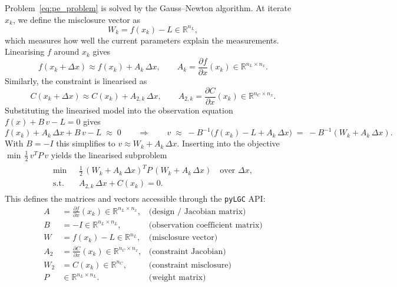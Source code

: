 \documentclass[a4paper,11pt]{article}
\newcommand{\code}[1]{\texttt{#1}}
\begin{document}
Problem~\eqref{eq:pe_problem} is solved by the Gauss--Newton algorithm.
At iterate $x_k$, we define the misclosure vector as
\begin{equation}
    W_k = f(x_k) - L \in \mathbb{R}^{n_L},
    \label{eq:misclosure}
\end{equation}
which measures how well the current parameters explain the measurements.
Linearising $f$ around $x_k$ gives
\begin{equation}
    f(x_k + \Delta x) \approx f(x_k) + A_k\, \Delta x,
    \qquad
    A_k = \frac{\partial f}{\partial x}(x_k) \in \mathbb{R}^{n_L \times n_x}.
    \label{eq:Adef}
\end{equation}
Similarly, the constraint is linearised as
\begin{equation}
    C(x_k + \Delta x) \approx C(x_k) + A_{2,k}\, \Delta x,
    \qquad
    A_{2,k} = \frac{\partial C}{\partial x}(x_k)
        \in \mathbb{R}^{n_C \times n_x}.
\end{equation}
Substituting the linearised model into the observation equation
$f(x) + B\,v - L = 0$ gives
\begin{equation}
    f(x_k) + A_k\,\Delta x + B\,v - L \;\approx\; 0
    \qquad\Longrightarrow\qquad
    v \;\approx\; -B^{-1}\bigl(f(x_k) - L + A_k\,\Delta x\bigr)
      \;=\; -B^{-1}(W_k + A_k\,\Delta x).
\end{equation}
With $B = -I$ this simplifies to $v \approx W_k + A_k\,\Delta x$.
Inserting into the objective
$\min\,\tfrac{1}{2}\,v^T P\,v$ yields the linearised subproblem
\begin{align}
  \begin{split}
    \min \;&\tfrac{1}{2}\, (W_k + A_k\,\Delta x)^T P\,
        (W_k + A_k\,\Delta x)
    \quad \text{over } \Delta x, \\
    \text{s.t.}\quad
    & A_{2,k}\,\Delta x + C(x_k) = 0.
  \end{split}
  \label{eq:GN_subproblem}
\end{align}
This defines the matrices and vectors accessible through the
\code{pyLGC} API:
\begin{align}
    A &= \frac{\partial f}{\partial x}(x_k) \in \mathbb{R}^{n_L \times n_x},
        &\text{(design / Jacobian matrix)} \\
    B &= -I \in \mathbb{R}^{n_L \times n_L},
        &\text{(observation coefficient matrix)} \\
    W &= f(x_k) - L \in \mathbb{R}^{n_L},
        &\text{(misclosure vector)} \\
    A_2 &= \frac{\partial C}{\partial x}(x_k) \in \mathbb{R}^{n_C \times n_x},
        &\text{(constraint Jacobian)} \\
    W_2 &= C(x_k) \in \mathbb{R}^{n_C},
        &\text{(constraint misclosure)} \\
    P &\in \mathbb{R}^{n_L \times n_L}.
        &\text{(weight matrix)}
\end{align}
\end{document}
